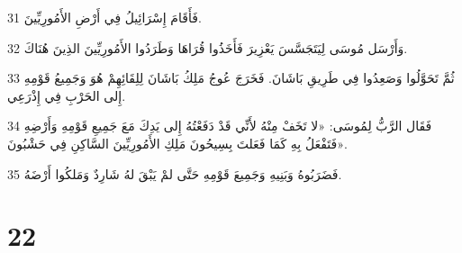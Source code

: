 \par 31 فَأَقَامَ إِسْرَائِيلُ فِي أَرْضِ الأَمُورِيِّينَ.
\par 32 وَأَرْسَل مُوسَى لِيَتَجَسَّسَ يَعْزِيرَ فَأَخَذُوا قُرَاهَا وَطَرَدُوا الأَمُورِيِّينَ الذِينَ هُنَاكَ.
\par 33 ثُمَّ تَحَوَّلُوا وَصَعِدُوا فِي طَرِيقِ بَاشَانَ. فَخَرَجَ عُوجُ مَلِكُ بَاشَانَ لِلِقَائِهِمْ هُوَ وَجَمِيعُ قَوْمِهِ إِلى الحَرْبِ فِي إِذْرَعِي.
\par 34 فَقَال الرَّبُّ لِمُوسَى: «لا تَخَفْ مِنْهُ لأَنِّي قَدْ دَفَعْتُهُ إِلى يَدِكَ مَعَ جَمِيعِ قَوْمِهِ وَأَرْضِهِ فَتَفْعَلُ بِهِ كَمَا فَعَلتَ بِسِيحُونَ مَلِكِ الأَمُورِيِّينَ السَّاكِنِ فِي حَشْبُونَ».
\par 35 فَضَرَبُوهُ وَبَنِيهِ وَجَمِيعَ قَوْمِهِ حَتَّى لمْ يَبْقَ لهُ شَارِدٌ وَمَلكُوا أَرْضَهُ.

\chapter{22}

